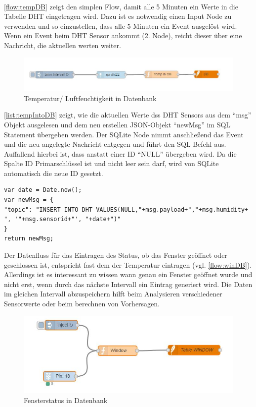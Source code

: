 \\
\autoref{flow:tempDB} zeigt den simplen Flow, damit alle 5 Minuten ein Werte in die Tabelle DHT eingetragen wird. Dazu ist es notwendig einen Input Node zu verwenden und so einzustellen, dass alle 5 Minuten ein Event ausgelöst wird. Wenn ein Event beim DHT Sensor ankommt (2. Node), reicht dieser über eine Nachricht, die aktuellen werten weiter. 
\begin{figure}[h]
	\centering
	\includegraphics[scale=0.7]{images/tempIntoDB}
	\caption{Temperatur/ Luftfeuchtigkeit in Datenbank}
	\label{flow:tempDB}
\end{figure}
\autoref{list:tempIntoDB} zeigt, wie die aktuellen Werte dss DHT Sensors aus dem \enquote{msg} Objekt ausgelesen und dem neu erstellen \ac{JSON}-Objekt \enquote{newMsg} im \ac{SQL} Statement übergeben werden. Der SQLite Node nimmt anschließend das Event und die neu angelegte Nachricht entgegen und führt den \ac{SQL} Befehl  aus. Auffallend hierbei ist, dass anstatt einer ID \enquote{NULL} übergeben wird. Da die Spalte ID Primarschlüssel ist und nicht leer sein darf, wird von SQLite automatisch die neue ID gesetzt.
\begin{lstlisting}[label=list:tempIntoDB, caption={Neuer Eintrag in Tabelle DHT}]
var date = Date.now();
var newMsg = {
"topic": "INSERT INTO DHT VALUES(NULL,"+msg.payload+","+msg.humidity+ ", '"+msg.sensorid+"', "+date+")"
}
return newMsg;
\end{lstlisting}
Der Datenfluss für das Eintragen des Status, ob das Fenster geöffnet oder geschlossen ist, entspricht fast dem der Temperatur eintragen (vgl. \autoref{flow:winDB}). Allerdings ist es interessant zu wissen wann genau ein Fenster geöffnet wurde und nicht erst, wenn durch das nächste Intervall ein Eintrag generiert wird. Die Daten im gleichen Intervall abzuspeichern hilft beim Analysieren verschiedener Sensorwerte oder beim berechnen von Vorhersagen. 
\begin{figure}[h]
	\centering
	\includegraphics[scale=0.7]{images/windowIntoDB}
	\caption{Fensterstatus in Datenbank}
	\label{flow:winDB}
\end{figure}

